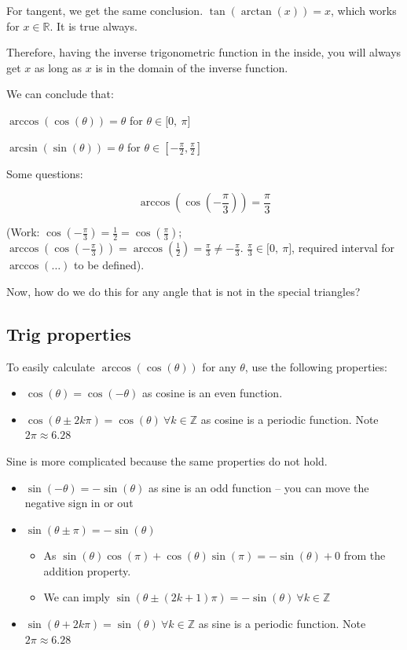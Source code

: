 \documentclass[
]{article}
\begin{document}
For tangent, we get the same conclusion.
$\tan\left( \arctan(x) \right) = x$, which works for
$x\mathbb{\in R}$. It is true always.

Therefore, having the inverse trigonometric function in the inside, you
will always get $x$ as long as $x$ is in the domain of the inverse
function.

We can conclude that:

$\arccos\left( \cos(\theta) \right) = \theta$ for
$\theta \in \lbrack 0,\ \pi\rbrack$

$\arcsin\left( \sin(\theta) \right) = \theta$ for
$\theta \in \left\lbrack - \frac{\pi}{2},\frac{\pi}{2} \right\rbrack$

Some questions:

$$\arccos\left( \cos\left( - \frac{\pi}{3} \right) \right) = \frac{\pi}{3}$$

(Work:
$\cos\left( - \frac{\pi}{3} \right) = \frac{1}{2} = \cos\left( \frac{\pi}{3} \right)$;
$\arccos\left( \cos\left( - \frac{\pi}{3} \right) \right) = \arccos\left( \frac{1}{2} \right) = \frac{\pi}{3} \neq - \frac{\pi}{3}$.
$\frac{\pi}{3} \in \lbrack 0,\ \pi\rbrack$, required interval for
$\arccos(\ldots)$ to be defined).

Now, how do we do this for any angle that is not in the special
triangles?


\subsection{Trig properties}

To easily calculate $\arccos\left( \cos(\theta) \right)$ for any
$\theta$, use the following properties:

\begin{itemize}
\item
  $\cos(\theta) = \cos( - \theta)$ as cosine is an even function.
\item
  $\cos(\theta \pm 2k\pi) = \cos(\theta)\ \forall k\mathbb{\in Z}$ as
  cosine is a periodic function. Note $2\pi \approx 6.28$
\end{itemize}

Sine is more complicated because the same properties do not hold.

\begin{itemize}
\item
  $\sin( - \theta) = - \sin(\theta)$ as sine is an odd function -- you
  can move the negative sign in or out
\item
  $\sin(\theta \pm \pi) = - \sin(\theta)$

  \begin{itemize}
  \item
    As
    $\sin(\theta)\cos(\pi) + \cos(\theta)\sin(\pi) = - \sin(\theta) + 0$
    from the addition property.
  \item
    We can imply
    $\sin\left( \theta \pm (2k + 1)\pi \right) = - \sin(\theta)\ \forall k\mathbb{\in Z}$
  \end{itemize}
\item
  $\sin(\theta + 2k\pi) = \sin(\theta)\ \forall k\mathbb{\in Z}$ as
  sine is a periodic function. Note $2\pi \approx 6.28$
\end{itemize}
\end{document}
